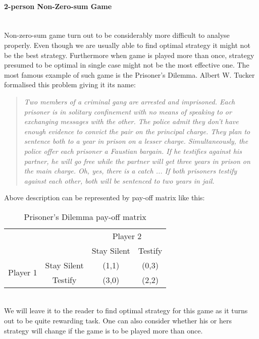 \documentclass[10pt, a4paper]{report}
\begin{document}
\paragraph{2-person Non-Zero-sum Game} ~\\
Non-zero-sum game turn out to be considerably more difficult to analyse properly. Even though we are usually able to find optimal strategy it might not be the best strategy. Furthermore when game is played more than once, strategy presumed to be optimal in single case might not be the most effective one. The most famous example of such game is the Prisoner's Dilemma. Albert W. Tucker formalised this problem giving it its name:
\begin{quotation}
\textit{
    Two members of a criminal gang are arrested and imprisoned. Each prisoner is in solitary confinement with no means of speaking to or exchanging messages with the other. The police admit they don't have enough evidence to convict the pair on the principal charge. They plan to sentence both to a year in prison on a lesser charge. Simultaneously, the police offer each prisoner a Faustian bargain. If he testifies against his partner, he will go free while the partner will get three years in prison on the main charge. Oh, yes, there is a catch ... If both prisoners testify against each other, both will be sentenced to two years in jail.}
    \end{quotation}
Above description can be represented by pay-off matrix like this:
\begin{table}[ht!]
	\hspace{-2em}
	\centering
	\begin{tabular}{cccc|}
		& & \multicolumn{2}{c}{Player 2}                                              \\ \cline{3-4}
		& & Stay Silent &  \multicolumn{1}{c}{Testify}                                \\ \cline{3-4}
		\multirow{2}{*}{Player 1} & \multicolumn{1}{|c|}{Stay Silent} & (1,1) & (0,3) \\
		& \multicolumn{1}{|c|}{Testify} & (3,0) & (2,2)                               \\ \cline{3-4}
	\end{tabular}
	\caption{Prisoner's Dilemma pay-off matrix}
\end{table}
\\
We will leave it to the reader to find optimal strategy for this game as it turns out to be quite rewarding task. One can also consider whether his or hers strategy will change if the game is to be played more than once.
\end{document}
